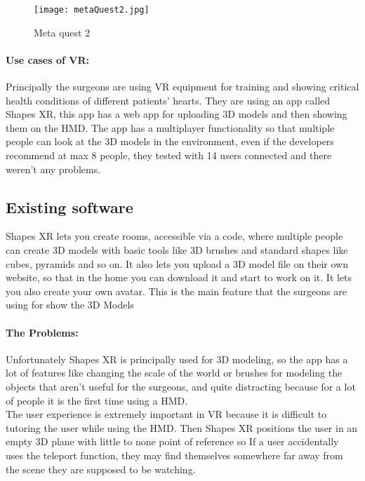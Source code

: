 \begin{figure}[ht]
  \centering
  \texttt{[image: metaQuest2.jpg]}
  \caption{Meta quest 2}
  \label{fig:metaQuest2}
\end{figure}

\paragraph{Use cases of VR:}
Principally the surgeons are using VR equipment for training and showing critical health conditions of different patients' hearts.
They are using an app called Shapes XR, this app has a web app for uploading 3D models and then showing them on the \ac{HMD}.
The app has a multiplayer functionality so that multiple people can look at the 3D models in the environment, even if the developers recommend at max 8 people, they tested with 14 users connected and there weren't any problems.

\subsection{Existing software}

Shapes XR lets you create rooms, accessible via a code, where multiple people can create 3D models with basic tools like 3D brushes and standard shapes like cubes, pyramids and so on.
It also lets you upload a 3D model file on their own website, so that in the home you can download it and start to work on it.
It lets you also create your own avatar.
This is the main feature that the surgeons are using for show the 3D Models

\paragraph{The Problems:}
Unfortunately Shapes XR is principally used for 3D modeling, so the app has a lot of features like changing the scale of the world or brushes for modeling the objects that aren't useful for the surgeons,
and quite distracting because for a lot of people it is the first time using a \ac{HMD}.\\
The user experience is extremely important in \ac{VR} because it is difficult to tutoring the user while using the \ac{HMD}.
Then Shapes XR positions the user in an empty 3D plane with little to none point of reference so If a user accidentally uses the teleport function, they may find themselves somewhere far away from the scene they are supposed to be watching.

